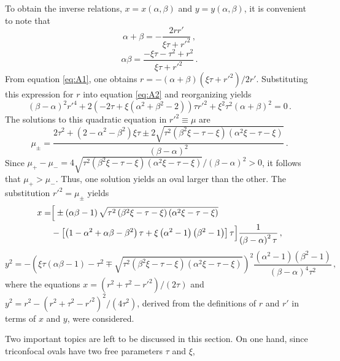 \documentclass[12pt, ams, nofootinbib]{revtex4}
\def\be{\begin{equation}}
\def\ee{\end{equation}}
\newcommand{\rob}[1]{\left(#1\right)}    %
\newcommand{\sqb}[1]{\left[#1\right]}    %
\theoremstyle{definition}
\begin{document}
To obtain the inverse relations, $x=x(\alpha,\beta)$ and $y=y(\alpha,\beta)$, it is convenient to note that
\be
	\alpha+\beta = -\frac{2rr'}{\xi\tau+r'^2}\,, \label{eq:A1}
\ee
\be
	\alpha\beta= \frac{-\xi\tau-\tau^2+r^2}{\xi\tau+r'^2}\,. \label{eq:A2}
\ee
From equation \ref{eq:A1}, one obtains $r=-(\alpha+\beta)(\xi\tau+r'^2)/2r'$. Substituting this expression for $r$ into equation \ref{eq:A2} and reorganizing yields
\be
(\beta -\alpha)^2 r'^{4} + 2\rob{-2\tau + \xi\rob{\alpha^2+\beta^2-2}}\tau r'^2 + \xi^2 \tau^2 (\alpha +\beta)^2 = 0\,.
\ee
The solutions to this quadratic equation in $r'^2\equiv\mu$ are 
\be
	\mu_{\pm} = 
\frac{2 \tau^{2}+\left(2-\alpha^{2}-\beta^{2}\right)\xi\tau \pm 2 \sqrt{\tau^{2} \left(\beta^{2} \xi -\tau -\xi \right) \left(\alpha^{2} \xi -\tau -\xi \right)} }{\left(\beta -\alpha \right)^{2}}\,.
\ee
Since $\mu_{+}-\mu_{-}= 4 \sqrt{\tau^2 \left(\beta^2 \xi -\tau -\xi \right) \left(\alpha^2 \xi-\tau - \xi\right)}/ (\beta -\alpha)^2>0$, it follows that $\mu_{+}>\mu_{-}$. Thus, one solution yields an oval larger than the other. The substitution $r'^2=\mu_{\pm}$ yields
\begin{align}
	x =& \Big[ \pm\rob{\alpha  \beta -1} \sqrt{\tau^2 \rob{\beta^2 \xi -\tau -\xi } \rob{\alpha^2 \xi -\tau -\xi }}\notag \\
	&-\sqb{\rob{1-\alpha^2+\alpha  \beta -\beta^2} \tau +\xi  \rob{\alpha^2-1} \rob{\beta^2-1}} \tau\Big]  \frac{1}{\rob{\beta -\alpha }^2 \tau}\,, \label{eq:xAB}
\end{align}
\be y^2 =  -\rob{\xi\tau(\alpha\beta -1) -\tau^2\mp\sqrt{\tau^2 \rob{\beta^2 \xi -\tau -\xi  } \rob{\alpha^2 \xi -\tau -\xi }}}^2\frac{\rob{\alpha^2-1} \rob{\beta^2-1}}{\rob{\beta -\alpha }^4 \tau^2}\,, \label{eq:yAB}
\ee
where the equations $x=(r^2+\tau^2-r'^2)/(2\tau)$ and $y^2=r^2-(r^2+\tau^2-r'^2)^2/(4\tau^2)$, derived from the definitions of $r$ and $r'$ in terms of $x$ and $y$, were considered.


Two important topics are left to be discussed in this section. On one hand, since triconfocal ovals have two free parameters $\tau$ and $\xi$, 
\end{document}
